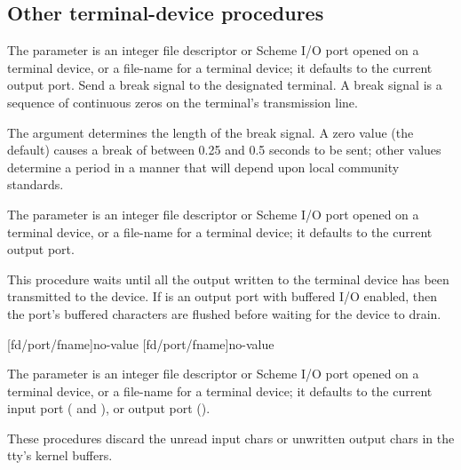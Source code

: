 \subsection{Other terminal-device procedures}
\begin{desc}
The  parameter is an integer file descriptor or 
Scheme I/O port opened on a terminal device, 
or a file-name for a terminal device; it defaults to the current output port.
Send a break signal to the designated terminal.
A break signal is a sequence of continuous zeros on the terminal's transmission
line.

The  argument determines the length of the break signal.
A zero value (the default) causes a break of between 
0.25 and 0.5 seconds to be sent;
other values determine a period in a manner that will depend upon local
community standards.
\end{desc}

\begin{desc}
The  parameter is an integer file descriptor or 
Scheme I/O port opened on a terminal device, 
or a file-name for a terminal device; it defaults to the current output port.

This procedure waits until all the output written to the
terminal device has been transmitted to the device.
If  is an output port with buffered I/O
enabled, then the port's buffered characters are flushed before
waiting for the device to drain.
\end{desc}

 {[fd/port/fname]}{no-value}
  {[fd/port/fname]}{no-value}
\begin{desc}
The  parameter is an integer file descriptor or 
Scheme I/O port opened on a terminal device, 
or a file-name for a terminal device; it defaults to the current input
port ( and ),
or output port ().

These procedures discard the unread input chars or unwritten
output chars in the tty's kernel buffers. 
\end{desc}

